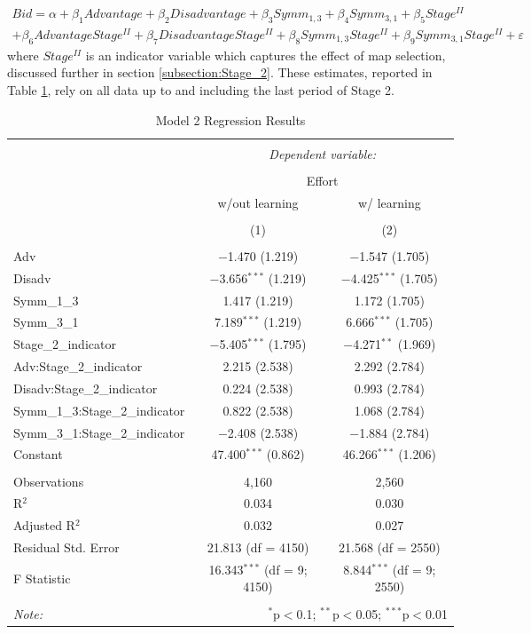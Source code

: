 \documentclass[AER]{AEA}
\begin{document}
\begin{multline}\label{model_2}
Bid = \alpha + \beta_1 Advantage + \beta_2 Disadvantage + \beta_3 Symm_{1,3} + \beta_4 Symm_{3,1} + \beta_5 Stage^{II} \\ + \beta_6 Advantage Stage^{II} + \beta_7 Disadvantage Stage^{II} + \beta_8 Symm_{1,3} Stage^{II} + \beta_9 Symm_{3,1} Stage^{II} + \varepsilon
\end{multline} 
where $Stage^{II}$ is an indicator variable which captures the effect of map selection, discussed further in section \ref{subsection:Stage_2}. These estimates, reported in Table \ref{Tab:regression_2}, rely on all data up to and including the last period of Stage 2. 
\begin{table}[!htbp] \centering 
  \caption{Model 2 Regression Results} 
  \label{Tab:regression_2} 
\begin{tabular}{@{\extracolsep{5pt}}lcc} 
\\[-1.8ex]\hline 
\hline \\[-1.8ex] 
 & \multicolumn{2}{c}{\textit{Dependent variable:}} \\ 
\cline{2-3} 
\\[-1.8ex] & \multicolumn{2}{c}{Effort} \\ 
 & w/out learning & w/ learning \\ 
\\[-1.8ex] & (1) & (2)\\ 
\hline \\[-1.8ex] 
 Adv & $-$1.470 (1.219) & $-$1.547 (1.705) \\ 
  Disadv & $-$3.656$^{***}$ (1.219) & $-$4.425$^{***}$ (1.705) \\ 
  Symm\_1\_3 & 1.417 (1.219) & 1.172 (1.705) \\ 
  Symm\_3\_1 & 7.189$^{***}$ (1.219) & 6.666$^{***}$ (1.705) \\ 
  Stage\_2\_indicator & $-$5.405$^{***}$ (1.795) & $-$4.271$^{**}$ (1.969) \\ 
  Adv:Stage\_2\_indicator & 2.215 (2.538) & 2.292 (2.784) \\ 
  Disadv:Stage\_2\_indicator & 0.224 (2.538) & 0.993 (2.784) \\ 
  Symm\_1\_3:Stage\_2\_indicator & 0.822 (2.538) & 1.068 (2.784) \\ 
  Symm\_3\_1:Stage\_2\_indicator & $-$2.408 (2.538) & $-$1.884 (2.784) \\ 
  Constant & 47.400$^{***}$ (0.862) & 46.266$^{***}$ (1.206) \\ 
 \hline \\[-1.8ex] 
Observations & 4,160 & 2,560 \\ 
R$^{2}$ & 0.034 & 0.030 \\ 
Adjusted R$^{2}$ & 0.032 & 0.027 \\ 
Residual Std. Error & 21.813 (df = 4150) & 21.568 (df = 2550) \\ 
F Statistic & 16.343$^{***}$ (df = 9; 4150) & 8.844$^{***}$ (df = 9; 2550) \\ 
\hline 
\hline \\[-1.8ex] 
\textit{Note:}  & \multicolumn{2}{r}{$^{*}$p$<$0.1; $^{**}$p$<$0.05; $^{***}$p$<$0.01} \\ 
\end{tabular} 
\end{table}
\end{document}
